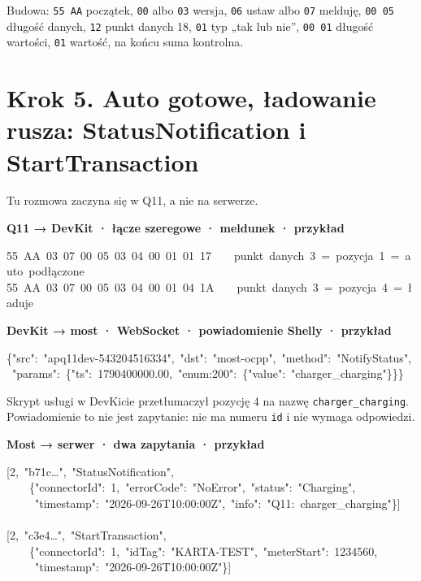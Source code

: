 \documentclass[11pt,a4paper]{article}
\begin{document}
Budowa: \texttt{55 AA} początek, \texttt{00} albo \texttt{03} wersja, \texttt{06} ustaw albo \texttt{07} melduję, \texttt{00 05} długość danych, \texttt{12} punkt danych 18, \texttt{01} typ „tak lub nie”, \texttt{00 01} długość wartości, \texttt{01} wartość, na końcu suma kontrolna.


\section*{Krok 5. Auto gotowe, ładowanie rusza: StatusNotification i StartTransaction}

Tu rozmowa zaczyna się w Q11, a nie na serwerze.


\textbf{Q11 {\symbolfont→} DevKit · łącze szeregowe · meldunek ·  przykład}


\begin{kodbox}
\mbox{}55\ AA\ 03\ 07\ 00\ 05\ 03\ 04\ 00\ 01\ 01\ 17\ \ \ \ punkt\ danych\ 3\ =\ pozycja\ 1\ =\ auto\ podłączone\\
\mbox{}55\ AA\ 03\ 07\ 00\ 05\ 03\ 04\ 00\ 01\ 04\ 1A\ \ \ \ punkt\ danych\ 3\ =\ pozycja\ 4\ =\ ładuje
\end{kodbox}

\textbf{DevKit {\symbolfont→} most · WebSocket · powiadomienie Shelly ·  przykład}


\begin{kodbox}
\mbox{}\{"src":\ "apq11dev-543204516334",\ "dst":\ "most-ocpp",\ "method":\ "NotifyStatus",\\
\mbox{}\ "params":\ \{"ts":\ 1790400000.00,\ "enum:200":\ \{"value":\ "charger\_charging"\}\}\}
\end{kodbox}

Skrypt usługi w DevKicie przetłumaczył pozycję 4 na nazwę \texttt{charger\_\allowbreak{}charging}. Powiadomienie to nie jest zapytanie: nie ma numeru \texttt{id} i nie wymaga odpowiedzi.


\textbf{Most {\symbolfont→} serwer · dwa zapytania ·  przykład}


\begin{kodbox}
\mbox{}[2,\ "b71c…",\ "StatusNotification",\\
\mbox{}\ \ \ \ \{"connectorId":\ 1,\ "errorCode":\ "NoError",\ "status":\ "Charging",\\
\mbox{}\ \ \ \ \ "timestamp":\ "2026-09-26T10:00:00Z",\ "info":\ "Q11:\ charger\_charging"\}]\\
\mbox{}\\
\mbox{}[2,\ "c3e4…",\ "StartTransaction",\\
\mbox{}\ \ \ \ \{"connectorId":\ 1,\ "idTag":\ "KARTA-TEST",\ "meterStart":\ 1234560,\\
\mbox{}\ \ \ \ \ "timestamp":\ "2026-09-26T10:00:00Z"\}]
\end{kodbox}
\end{document}
